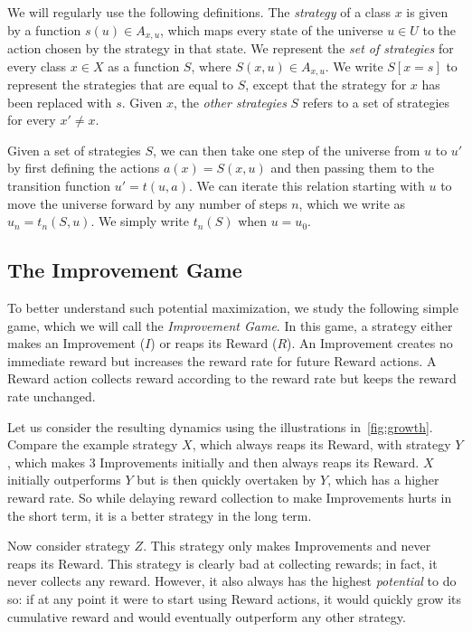 We will regularly use the following definitions. The \emph{strategy} of a class
$x$ is given by a function $s(u) \in A_{x,u}$, which maps every state of the
universe $u \in U$ to the action chosen by the strategy in that state. We
represent the \emph{set of strategies} for every class $x \in X$ as a function
$S$, where $S(x,u) \in A_{x,u}$. We write $S[x = s]$ to represent the
strategies that are equal to $S$, except that the strategy for $x$ has been
replaced with $s$. Given $x$, the \emph{other strategies} $S$ refers to a set
of strategies for every $x' \neq x$.

Given a set of strategies $S$, we can then take one step of the universe from
$u$ to $u'$ by first defining the actions $a(x) = S(x,u)$ and then passing them
to the transition function $u' = t(u, a)$. We can iterate this relation starting
with $u$ to move the universe forward by any number of steps $n$, which we write
as $u_n = t_n(S,u)$. We simply write $t_n(S)$ when $u = u_0$.

\subsection{The Improvement Game}
\label{sec:improvement}

To better understand such potential maximization, we study the following simple game,
which we will call the \emph{Improvement Game}. In this game, a strategy
either makes an Improvement ($I$) or reaps its Reward ($R$). An Improvement creates no
immediate reward but increases the reward rate for future Reward
actions. A Reward action collects reward
according to the reward rate but keeps the reward rate unchanged.

Let us consider the resulting dynamics using the illustrations
in~\cref{fig:growth}. Compare the example strategy $X$, which always reaps its Reward,
with strategy $Y$, which makes 3 Improvements initially and then always
reaps its Reward. $X$ initially outperforms $Y$ but is then quickly overtaken by $Y$,
which has a higher reward rate. So while delaying reward collection to make
Improvements hurts in the short term, it is a better strategy in the long term.

Now consider strategy $Z$. This strategy only makes Improvements and never
reaps its Reward. This strategy is clearly bad at collecting rewards; in fact, it
never collects any reward. However, it also always has the highest
\emph{potential} to do so: if at any point it were to start using Reward
actions, it would quickly grow its cumulative reward and would eventually
outperform any other strategy.

